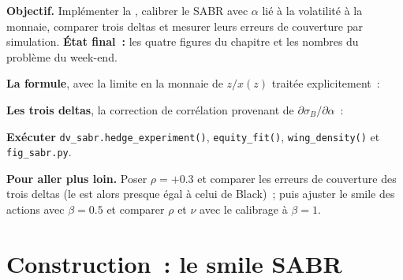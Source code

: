 \begin{tutorial}
\textbf{Objectif.} Implémenter la , calibrer le SABR avec $\alpha$ lié à la volatilité à la monnaie, comparer
trois deltas et mesurer leurs erreurs de couverture par simulation. \textbf{État final~:} les quatre figures du chapitre
et les nombres du problème du week-end.
\begin{tutsteps}
\item \textbf{La formule}, avec la limite en la monnaie de $z/x(z)$ traitée explicitement~:
\label{lst:dv:sabr-and-smile-dynamics:hagan}
\item \textbf{Les trois deltas}, la correction de corrélation provenant de $\partial\sigma_B/\partial\alpha$~:
\label{lst:dv:sabr-and-smile-dynamics:deltas}
\item \textbf{Exécuter} \texttt{dv\_sabr.hedge\_experiment()}, \texttt{equity\_fit()}, \texttt{wing\_density()} et
\texttt{fig\_sabr.py}.
\end{tutsteps}
\textbf{Pour aller plus loin.} Poser $\rho=+0.3$ et comparer les erreurs de couverture des trois deltas (le  est alors presque égal à celui de Black)~; puis ajuster le smile des actions avec $\beta=0.5$ et comparer $\rho$ et $\nu$ avec le
calibrage à $\beta=1$.
\end{tutorial}

\section{Construction~: le smile SABR}\label{bld:dv:sabr-and-smile-dynamics:sabr}


